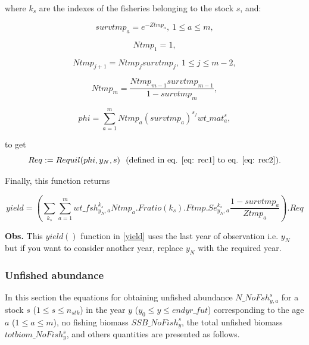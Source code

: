 \documentclass{article}
\begin{document}
where $k_s$ are the indexes of the fisheries belonging to the stock $s$, and:

\begin{equation}
    survtmp_a=e^{-Ztmp_a}, \ 1\leq a \leq m,
\end{equation}

\begin{equation}
    Ntmp_1=1,
\end{equation}

\begin{equation}
    Ntmp_{j+1} = Ntmp_j  survtmp_j, \ 1\leq j \leq m-2,
\end{equation}

\begin{equation}
    Ntmp_m=\dfrac{Ntmp_{m-1}  survtmp_{m-1}}{1-survtmp_m},
\end{equation}

\begin{equation}
    phi=\sum_{a=1}^m Ntmp_a(survtmp_a)^{s_f}wt\_mat^s_a,
\end{equation}

to get
\begin{equation}
    Req:=Requil(phi,y_N,s) \  \text{   (defined in eq. \ref{eq: rec1} to eq. \ref{eq: rec2})}.
\end{equation}

Finally, this function returns

\begin{equation}
    yield=\left(\sum_{k_s}\sum_{a=1}^m wt\_fsh^{k_s}_{y_N,a}Ntmp_a.Fratio(k_s) .Ftmp.Se^{k_s}_{y_N,a}\dfrac{1-survtmp_a}{Ztmp_a}\right).Req
\end{equation}

\textbf{Obs.} This $yield()$ function in \ref{yield} uses the last year of observation i.e. $y_N$ but if you want to consider another year,  replace $y_N$ with the required year.\\

\subsubsection{Unfished abundance}

In this section the equations for obtaining unfished abundance  $N\_NoFsh^s_{y,a}$ for a stock $s$ ($1\leq s \leq n_{stk}$) in the year $y$ ($y_0\leq y \leq endyr\_fut$) corresponding to the 
age $a$ ($1 \leq a \leq m$), no fishing biomass $SSB\_NoFish^s_y$, the total unfished biomass  $totbiom\_NoFish^s_y$, and others quantities are presented as follows.
\end{document}
